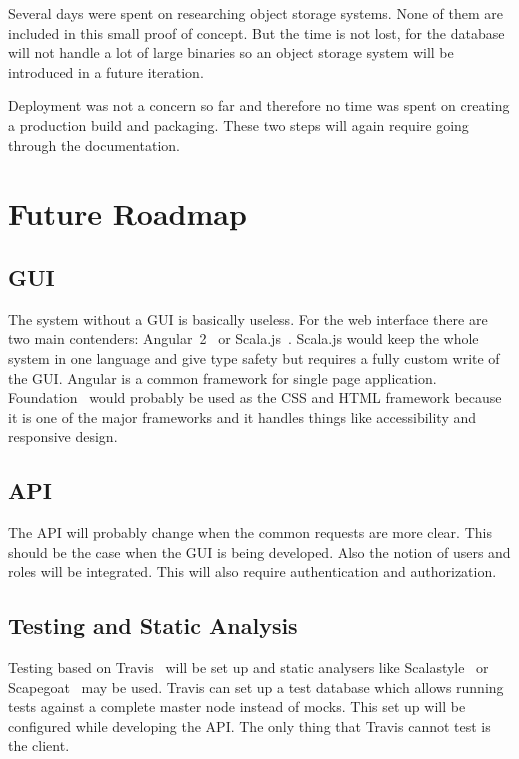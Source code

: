 \documentclass[a4paper,twocolumn,twoside]{article}
\begin{document}
Several days were spent on researching object storage systems.
None of them are included in this small proof of concept.
But the time is not lost, for the database will not handle a lot of large binaries so
an object storage system will be introduced in a future iteration.

Deployment was not a concern so far and therefore no time was spent on creating a production build and packaging.
These two steps will again require going through the documentation.



\section{Future Roadmap}

\subsection*{GUI}
The system without a GUI is basically useless.
For the web interface there are two main contenders: Angular~2~\cite{Angular2} or Scala.js~\cite{ScalaJs}.
Scala.js would keep the whole system in one language and give type safety but requires a fully custom write of the GUI.
Angular is a common framework for single page application.
Foundation~\cite{Foundation} would probably be used as the CSS and HTML framework 
because it is one of the major frameworks and it handles things like accessibility and responsive design.

\subsection*{API}
The API will probably change when the common requests are more clear.
This should be the case when the GUI is being developed.
Also the notion of users and roles will be integrated.
This will also require authentication and authorization.

\subsection*{Testing and Static Analysis}
Testing based on Travis~\cite{Travis} will be set up and static analysers like Scalastyle~\cite{Scalastyle} or Scapegoat~\cite{Scapegoat} may be used.
Travis can set up a test database which allows running tests against a complete master node instead of mocks.
This set up will be configured while developing the API.
The only thing that Travis cannot test is the client.
\end{document}
